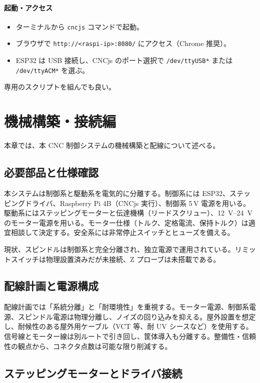 \documentclass[uplatex,dvipdfmx]{ujarticle}
\begin{document}
\paragraph{起動・アクセス}
\begin{itemize}
  \item ターミナルから \texttt{cncjs} コマンドで起動。
  \item ブラウザで \texttt{http://<raspi-ip>:8080/} にアクセス（Chrome 推奨）。
  \item ESP32 は USB 接続し、CNCjs のポート選択で \texttt{/dev/ttyUSB*} または \texttt{/dev/ttyACM*} を選ぶ。
\end{itemize}
専用のスクリプトを組んでも良い｡
\section{機械構築・接続編}

本章では、本 CNC 制御システムの機械構築と配線について述べる。

\subsection{必要部品と仕様確認}

本システムは制御系と駆動系を電気的に分離する。制御系には ESP32、ステッピングドライバ、Raspberry Pi 4B（CNCjs 実行）、制御系 5\,V 電源を用いる。駆動系にはステッピングモーターと伝達機構（リードスクリュー）、\SIrange{12}{24}{\volt} のモーター電源を用いる。モーター仕様（トルク、定格電流、保持トルク）は適宜相談して決定する。安全系には非常停止スイッチとヒューズを備える。

現状、スピンドルは制御系と完全分離され、独立電源で運用されている。リミットスイッチは物理設置済みだが未接続、Z プローブは未搭載である。

\subsection{配線計画と電源構成}

配線計画では「系統分離」と「耐環境性」を重視する。モーター電源、制御系電源、スピンドル電源は物理分離し、ノイズの回り込みを抑える。屋外設置を想定し、耐候性のある屋外用ケーブル（VCT 等、耐 UV シースなど）を使用する。信号線とモーター線は別ルートで引き回し、筐体導入も分離する。整備性・信頼性の観点から、コネクタ点数は可能な限り削減する。

\subsection{ステッピングモーターとドライバ接続}
\end{document}
